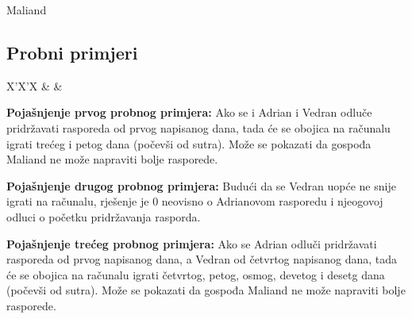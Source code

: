 \begin{statement}[
  problempoints=100,
  timelimit=2 sekunde,
  memorylimit=512 MiB,
]{Maliand}
\subsection*{Probni primjeri}
\begin{tabularx}{\textwidth}{X'X'X}
 &
 &
\end{tabularx}

\textbf{Pojašnjenje prvog probnog primjera:} Ako se i Adrian i Vedran odluče
pridržavati rasporeda od prvog napisanog dana, tada će se obojica na računalu
igrati trećeg i petog dana (počevši od sutra). Može se pokazati da gospođa
Maliand ne može napraviti bolje rasporede.

\textbf{Pojašnjenje drugog probnog primjera:} Budući da se Vedran uopće ne
snije igrati na računalu, rješenje je $0$ neovisno o Adrianovom rasporedu i
njeogovoj odluci o početku pridržavanja rasporda.

\textbf{Pojašnjenje trećeg probnog primjera:} Ako se Adrian odluči pridržavati
rasporeda od prvog napisanog dana, a Vedran od četvrtog napisanog dana, tada će
se obojica na računalu igrati četvrtog, petog, osmog, devetog i desetg dana
(počevši od sutra). Može se pokazati da gospođa Maliand ne može napraviti bolje
rasporede.


\end{statement}

